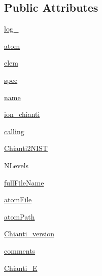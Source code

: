 \subsection*{Public Attributes}
\begin{DoxyCompactItemize}
\item 
\hyperlink{classpyneb_1_1utils_1_1pn__chianti_1_1___atom_chianti_afd87151907f32bc0dc45f0171b61374e}{log\-\_\-}
\item 
\hyperlink{classpyneb_1_1utils_1_1pn__chianti_1_1___atom_chianti_a0c5c7091b1d8a95d9bee2744d713f5c9}{atom}
\item 
\hyperlink{classpyneb_1_1utils_1_1pn__chianti_1_1___atom_chianti_a62e73dc66c7aff7941c5ce94e808c23a}{elem}
\item 
\hyperlink{classpyneb_1_1utils_1_1pn__chianti_1_1___atom_chianti_adaf1b66faf18504ec4b5c8c0b7f6763b}{spec}
\item 
\hyperlink{classpyneb_1_1utils_1_1pn__chianti_1_1___atom_chianti_ab74e6bf80237ddc4109968cedc58c151}{name}
\item 
\hyperlink{classpyneb_1_1utils_1_1pn__chianti_1_1___atom_chianti_afcfd897e5617cc9f3a7239ef78e821ee}{ion\-\_\-chianti}
\item 
\hyperlink{classpyneb_1_1utils_1_1pn__chianti_1_1___atom_chianti_ab25fa7ebe84b603684dee62410c1e34c}{calling}
\item 
\hyperlink{classpyneb_1_1utils_1_1pn__chianti_1_1___atom_chianti_a48e401b4ff0a724d7b4d697b02a59846}{Chianti2\-N\-I\-S\-T}
\item 
\hyperlink{classpyneb_1_1utils_1_1pn__chianti_1_1___atom_chianti_a4d45fe163c2108853ab418386bf4da56}{N\-Levels}
\item 
\hyperlink{classpyneb_1_1utils_1_1pn__chianti_1_1___atom_chianti_a6df8c03c050eea50de355d36d398c5b8}{full\-File\-Name}
\item 
\hyperlink{classpyneb_1_1utils_1_1pn__chianti_1_1___atom_chianti_afa3c4660b3bcf1e2c199413048b9209e}{atom\-File}
\item 
\hyperlink{classpyneb_1_1utils_1_1pn__chianti_1_1___atom_chianti_a18178a28ecf0c7f251d0974c2097b214}{atom\-Path}
\item 
\hyperlink{classpyneb_1_1utils_1_1pn__chianti_1_1___atom_chianti_a1caebb547c4fc66d6e9136a4009d8010}{Chianti\-\_\-version}
\item 
\hyperlink{classpyneb_1_1utils_1_1pn__chianti_1_1___atom_chianti_a64b8b36116751d566275b722e40bb3a7}{comments}
\item 
\hyperlink{classpyneb_1_1utils_1_1pn__chianti_1_1___atom_chianti_a12aa769742ad8da0e534425ac0d52c86}{Chianti\-\_\-\-E}

\end{DoxyCompactItemize}
